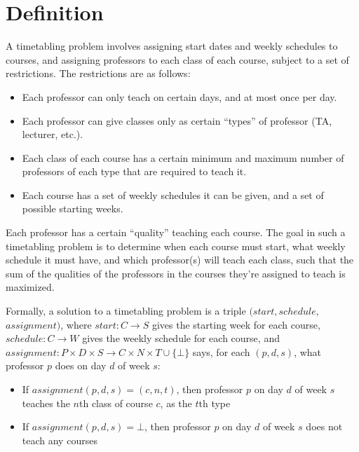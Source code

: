 \section{Definition}

A timetabling problem involves assigning start dates and weekly schedules to courses, and assigning professors to each class of each course, subject to a set of restrictions. The restrictions are as follows:

\begin{itemize}
\item Each professor can only teach on certain days, and at most once per day.
\item Each professor can give classes only as certain ``types'' of professor (TA, lecturer, etc.).
\item Each class of each course has a certain minimum and maximum number of professors of each type that are required to teach it.
\item Each course has a set of weekly schedules it can be given, and a set of possible starting weeks.
\end{itemize}

Each professor has a certain ``quality'' teaching each course. The goal in such a timetabling problem is to determine when each course must start, what weekly schedule it must have, and which professor(s) will teach each class, such that the sum of the qualities of the professors in the courses they're assigned to teach is maximized.



Formally, a solution to a timetabling problem is a triple $(start, schedule,$ $assignment)$, where $start: C \to S$ gives the starting week for each course, $schedule: C \to W$ gives the weekly schedule for each course, and $assignment: P \times D \times S \to C \times N \times T \cup \{\bot\}$ says, for each $(p, d, s)$, what professor $p$ does on day $d$ of week $s$:
\begin{itemize}
\item If $assignment(p, d, s) = (c, n, t)$, then professor $p$ on day $d$ of week $s$ teaches the $n$th class of course $c$, as the $t$th type
\item If $assignment(p, d, s) = \bot$, then professor $p$ on day $d$ of week $s$ does not teach any courses
\end{itemize}
